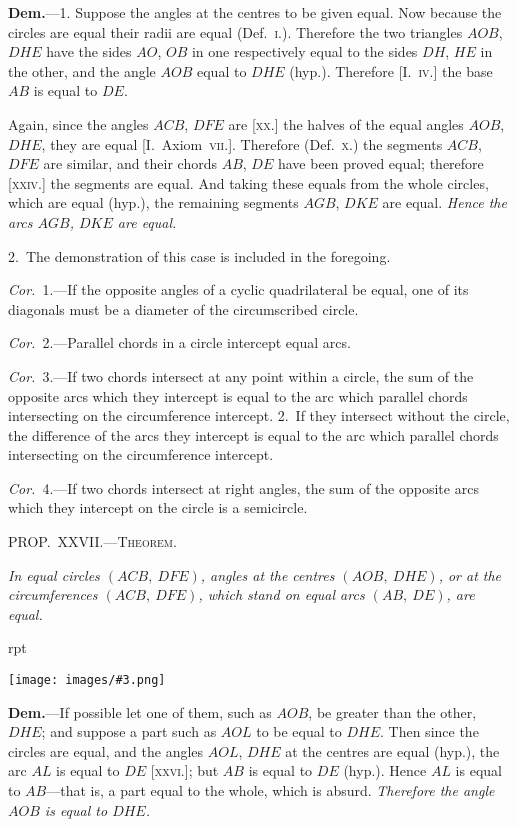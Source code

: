 \documentclass[oneside]{book}
\newcounter{wrapwidth}
\newcommand\mypropl[2]{
\bigskip\Needspace*{4\baselineskip}\begin{center}\textsc{#1}\end{center}
\hspace{\parindent}\emph{#2}\par\medskip
}
\newcommand\imgflow[3]{
\setcounter{wrapwidth}{#1}
\begin{wrapfigure}[#2]{r}{\value{wrapwidth}pt}
\begin{center}
\vspace{-0.3in}
\texttt{[image: images/\#3.png]}
\end{center}
\end{wrapfigure}
}
\begin{document}
\textbf{Dem.}---1. Suppose the angles at the centres to be
given equal. Now because the circles are equal their
radii are equal (Def.~\textsc{i}.).
Therefore the
two triangles $AOB$,
$DHE$ have the sides
$AO$, $OB$ in one respectively
equal to
the sides $DH$, $HE$
in the other, and the
angle $AOB$ equal to
$DHE$ (hyp.). Therefore [I.~\textsc{iv.}] the base $AB$ is equal
to $DE$.

Again, since the angles $ACB$, $DFE$ are [\textsc{xx.}] the
halves of the equal angles $AOB$, $DHE$, they are equal
[I.~Axiom~\textsc{vii.}]. Therefore (Def.~\textsc{x.}) the segments
$ACB$, $DFE$ are similar, and their chords $AB$, $DE$ have
been proved equal; therefore [\textsc{xxiv.}] the segments are
equal. And taking these equals from the whole circles,
which are equal (hyp.), the remaining segments $AGB$,
$DKE$ are equal. \emph{Hence the arcs $AGB$, $DKE$ are equal.}

2.~The demonstration of this case is included in the
foregoing.

\emph{Cor.}~1.---If the opposite angles of a cyclic quadrilateral
be equal, one of its diagonals must be a diameter
of the circumscribed circle.

\emph{Cor.}~2.---Parallel chords in a circle intercept equal
arcs.

\emph{Cor.}~3.---If two chords intersect at any point within
a circle, the sum of the opposite arcs which they intercept
is equal to the arc which parallel chords intersecting
on the circumference intercept. 2.~If they
intersect without the circle, the difference of the arcs
they intercept is equal to the arc which parallel chords
intersecting on the circumference intercept.

\emph{Cor.}~4.---If two chords intersect at right angles, the
sum of the opposite arcs which they intercept on the
circle is a semicircle.

\mypropl{PROP\@.~XXVII\@.---Theorem.}{In equal circles $(ACB,\ DFE)$, angles at the centres
$(AOB,\ DHE)$, or at the circumferences $(ACB,\ DFE)$,
which stand on equal arcs $(AB,\ DE)$, are equal.}

\imgflow{190}{9}{f134}

\textbf{Dem.}---If possible let one of them, such as $AOB$,
be greater than the
other, $DHE$; and
suppose a part such
as $AOL$ to be equal
to $DHE$. Then since
the circles are equal,
and the angles $AOL$,
$DHE$ at the centres
are equal (hyp.), the
arc $AL$ is equal to $DE$ [\textsc{xxvi.}]; but $AB$ is equal to $DE$
(hyp.). Hence $AL$ is equal to $AB$---that is, a part
equal to the whole, which is absurd. \emph{Therefore the
angle $AOB$ is equal to $DHE$.}
\end{document}
